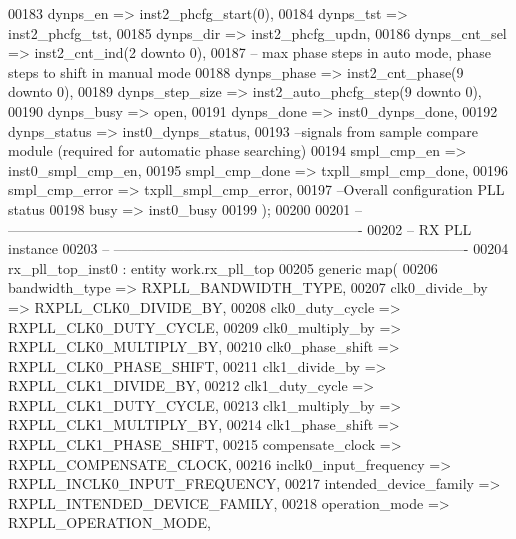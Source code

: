 \begin{DoxyCode}
00183    dynps_en          => inst2_phcfg_start\textcolor{vhdlchar}{(}\textcolor{vhdllogic}{0}\textcolor{vhdlchar}{)},
00184    dynps_tst         => inst2_phcfg_tst,
00185    dynps_dir         => inst2_phcfg_updn,
00186    dynps_cnt_sel     => inst2_cnt_ind\textcolor{vhdlchar}{(}\textcolor{vhdllogic}{2} \textcolor{keywordflow}{downto} \textcolor{vhdllogic}{0}\textcolor{vhdlchar}{)},
00187 \textcolor{keyword}{   -- max phase steps in auto mode, phase steps to shift in manual mode}
00188    dynps_phase       => inst2_cnt_phase\textcolor{vhdlchar}{(}\textcolor{vhdllogic}{9} \textcolor{keywordflow}{downto} \textcolor{vhdllogic}{0}\textcolor{vhdlchar}{)},
00189    dynps_step_size   => inst2_auto_phcfg_step\textcolor{vhdlchar}{(}\textcolor{vhdllogic}{9} \textcolor{keywordflow}{downto} \textcolor{vhdllogic}{0}\textcolor{vhdlchar}{)},
00190    dynps_busy        => \textcolor{keywordflow}{open},
00191    dynps_done        => inst0_dynps_done,
00192    dynps_status      => inst0_dynps_status,
00193 \textcolor{keyword}{   --signals from sample compare module (required for automatic phase searching)}
00194    smpl_cmp_en       => inst0_smpl_cmp_en,
00195    smpl_cmp_done     => txpll_smpl_cmp_done,
00196    smpl_cmp_error    => txpll_smpl_cmp_error,
00197 \textcolor{keyword}{   --Overall configuration PLL status}
00198    busy              => inst0_busy   
00199    \textcolor{vhdlchar}{)};
00200    
00201 \textcolor{keyword}{-- ----------------------------------------------------------------------------}
00202 \textcolor{keyword}{-- RX PLL instance}
00203 \textcolor{keyword}{-- ----------------------------------------------------------------------------}
00204 rx\_pll\_top\_inst0 : \textcolor{keywordflow}{entity} work.rx_pll_top
00205    \textcolor{keywordflow}{generic} \textcolor{keywordflow}{map}(
00206       bandwidth_type          => RXPLL_BANDWIDTH_TYPE,
00207       clk0_divide_by          => RXPLL_CLK0_DIVIDE_BY,
00208       clk0_duty_cycle         => RXPLL_CLK0_DUTY_CYCLE,
00209       clk0_multiply_by        => RXPLL_CLK0_MULTIPLY_BY,
00210       clk0_phase_shift        => RXPLL_CLK0_PHASE_SHIFT,
00211       clk1_divide_by          => RXPLL_CLK1_DIVIDE_BY,
00212       clk1_duty_cycle         => RXPLL_CLK1_DUTY_CYCLE,
00213       clk1_multiply_by        => RXPLL_CLK1_MULTIPLY_BY,
00214       clk1_phase_shift        => RXPLL_CLK1_PHASE_SHIFT,
00215       compensate_clock        => RXPLL_COMPENSATE_CLOCK,
00216       inclk0_input_frequency  => RXPLL_INCLK0_INPUT_FREQUENCY,
00217       intended_device_family  => RXPLL_INTENDED_DEVICE_FAMILY,
00218       operation_mode          => RXPLL_OPERATION_MODE,

\end{DoxyCode}
